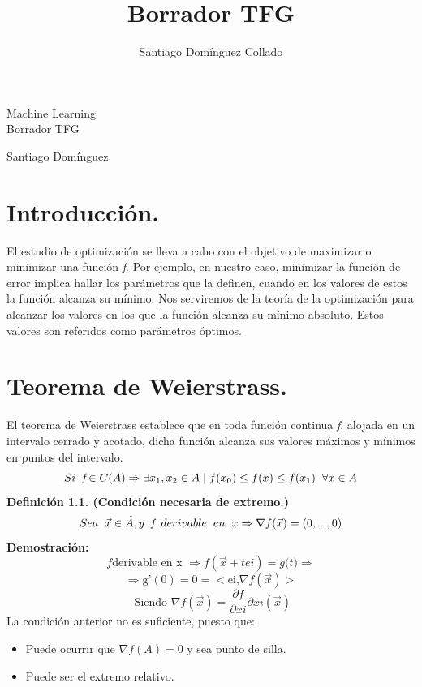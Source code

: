 \documentclass[a4paper,10pt]{article}
\author{Santiago Domínguez Collado}
\title{Borrador TFG}
\begin{document}
\begin{center}
\begin{LARGE}
Machine Learning \\
\vspace*{0.15in}
\UseRawInputEncoding
Borrador TFG
\end{LARGE}
\end{center}
\begin{center}
\begin{large}
Santiago Domínguez
\end{large}
\end{center}

\section{Introducción.}
\label{}
\noindent
El estudio de optimización se lleva a cabo con el objetivo de maximizar o minimizar una función \textit{f}.
Por ejemplo, en nuestro caso, minimizar la función de error implica hallar los parámetros que la definen, cuando en los valores de estos la función alcanza su mínimo.
Nos serviremos de la teoría de la optimización para alcanzar los valores en los que la función alcanza su mínimo absoluto. Estos valores son referidos como parámetros óptimos.
\section{Teorema de Weierstrass.}
\noindent
El teorema de Weierstrass establece que en toda función continua \textit{f}, alojada en un intervalo cerrado y acotado, dicha función alcanza sus valores máximos y mínimos en puntos del intervalo.
 \[Si \hspace{0.20cm} \textit{f} \in C(A) \Rightarrow \exists x_{1},x_{2} \in A \mid f(x_{0}) \leq f(x) \leq f(x_{1}) \hspace{0.20cm} \forall x \in A\] 
\textbf{Definición 1.1. (Condición necesaria de extremo.)}
\noindent
\[Sea \hspace{0.20cm} \vec{x} \in \mathring{A}, y\hspace{0.20cm} \textit{f}\hspace{0.20cm} derivable\hspace{0.20cm} en \hspace{0.20cm}x \Rightarrow \nabla f(\vec{x}) = (0,...,0)\]
\textbf{Demostración:} \[f \text{derivable en x } \Rightarrow f(\vec{x}+tei)=\textit{g(t)}\Rightarrow \] 
\[ \Rightarrow \text{g'} (0)=0= <\text{ei,} \nabla f(\vec{x}) >\] 
\[\text{ Siendo }  \nabla f(\vec{x})= \frac{\partial f}{\partial xi} \partial xi (\vec{x})\]
La condición anterior no es suficiente, puesto que:
\begin{itemize}
    \item Puede ocurrir que $\nabla f(A) = 0$ y sea punto de silla.
    \item Puede ser el extremo relativo.
\end{itemize}
\end{document}
